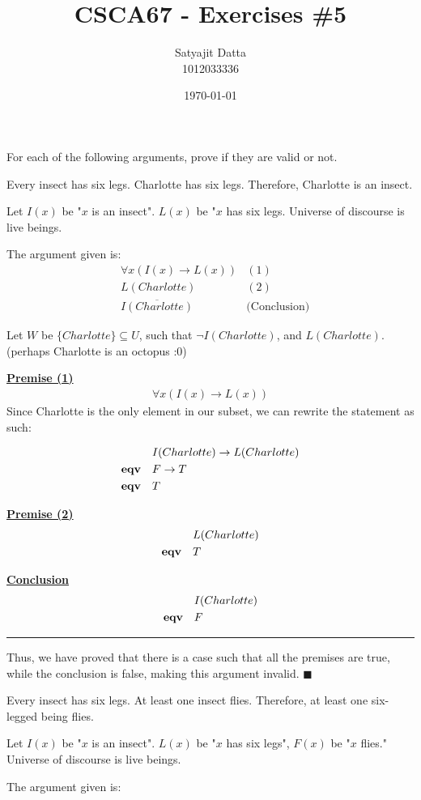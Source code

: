\documentclass[]{article}
\title{\textbf{CSCA67 - Exercises \#5}}
\author{Satyajit Datta \\ 1012033336}
\date{\today}
\begin{document}
\maketitle

For each of the following arguments, prove if they are valid or not.


\begin{question}{1.1}
Every insect has six legs. Charlotte has six legs. Therefore, Charlotte is an insect.

Let $I(x)$ be "$x$ is an insect". $L(x)$ be "$x$ has six legs. Universe of discourse is live beings.
\end{question}

The argument given is:
\begin{align*}
    & \forall x(I(x) \rightarrow L(x)) & (1)\\
    & L(Charlotte) & (2)\\
    & \overline{I(Charlotte)} & \text{(Conclusion)}
\end{align*}
\medbreak

Let $W$ be $\{Charlotte\} \subseteq U$, such that $\neg I(Charlotte)$, and $L(Charlotte)$. (perhaps Charlotte is an octopus :0)

\underline{\bf{Premise (1)}}
\begin{align*}
     \forall x(I(x) \rightarrow L(x)) 
\end{align*}
Since Charlotte is the only element in our subset, we can rewrite the statement as such:

\begin{align*}
    & I(Charlotte) \rightarrow L(Charlotte) \\
    \text{\bf{eqv}}\quad& F \rightarrow T \\ 
   \text{\bf{eqv}}\quad & T
\end{align*}

\underline{\bf{Premise (2)}}
\begin{align*}
    & L(Charlotte) \\ 
    \text{\bf{eqv}}\quad & T
\end{align*}

\underline{\bf{Conclusion}}
\begin{align*}
    & I(Charlotte) \\ 
    \text{\bf{eqv}}\quad & F
\end{align*}

\hrule
\vspace{0.1in}
Thus, we have proved that there is a case such that all the premises are true, 
while the conclusion is false, making this argument invalid. $\blacksquare$
\begin{question}{1.2}
Every insect has six legs. At least one insect flies. Therefore, at least one six-legged being flies.

Let $I(x)$ be "$x$ is an insect". $L(x)$ be "$x$ has six legs", $F(x)$ be "$x$ flies." Universe of discourse is live beings.
\end{question}
The argument given is: 
\end{document}
